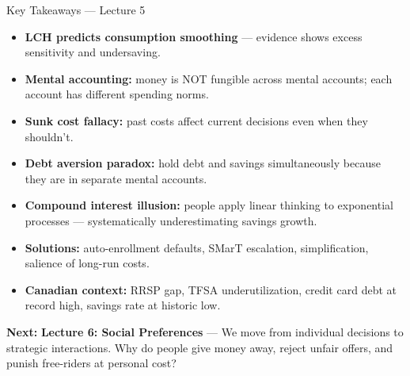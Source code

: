 \documentclass[aspectratio=169]{beamer}
\begin{document}
\begin{frame}{Key Takeaways --- Lecture 5}
\begin{itemize}\small\setlength{\itemsep}{0pt}
  \item[\textcolor{beteal}{\checkmark}] \textbf{LCH predicts consumption smoothing} --- evidence shows excess sensitivity and undersaving.
  \item[\textcolor{beteal}{\checkmark}] \textbf{Mental accounting:} money is NOT fungible across mental accounts; each account has different spending norms.
  \item[\textcolor{beteal}{\checkmark}] \textbf{Sunk cost fallacy:} past costs affect current decisions even when they shouldn't.
  \item[\textcolor{beteal}{\checkmark}] \textbf{Debt aversion paradox:} hold debt and savings simultaneously because they are in separate mental accounts.
  \item[\textcolor{beteal}{\checkmark}] \textbf{Compound interest illusion:} people apply linear thinking to exponential processes --- systematically underestimating savings growth.
  \item[\textcolor{beteal}{\checkmark}] \textbf{Solutions:} auto-enrollment defaults, SMarT escalation, simplification, salience of long-run costs.
  \item[\textcolor{beteal}{\checkmark}] \textbf{Canadian context:} RRSP gap, TFSA underutilization, credit card debt at record high, savings rate at historic low.
\end{itemize}
\smallskip\textcolor{beblue}{\textbf{Next:}} \textbf{Lecture 6: Social Preferences} --- We move from individual decisions to strategic interactions. Why do people give money away, reject unfair offers, and punish free-riders at personal cost?
\end{frame}
\end{document}
